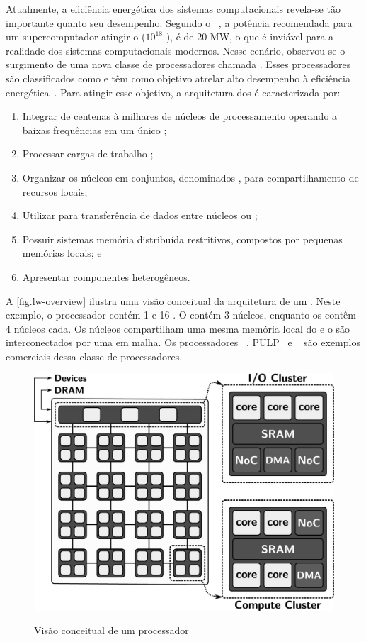 Atualmente, a eficiência energética dos sistemas computacionais revela-se tão importante quanto seu desempenho. Segundo o \darpa~\cite{darpa:exascale}, a potência recomendada para um supercomputador atingir o \exascale ($10^{18}$ \flops), é de 20 MW, o que é inviável para a realidade dos sistemas computacionais modernos. Nesse cenário, observou-se o surgimento de uma nova classe de processadores chamada \lw. Esses processadores são classificados como \mpsocs e têm como objetivo atrelar alto desempenho à eficiência energética~\cite{francesquini2015}. Para atingir esse objetivo, a arquitetura dos \lws é caracterizada por:
\begin{enumerate}[label=(\roman*)]
    \item Integrar de centenas à milhares de núcleos de processamento operando a baixas frequências em um único \chip;
    \item Processar cargas de trabalho \mimd;
    \item Organizar os núcleos em conjuntos, denominados \clusters, para compartilhamento de recursos locais;
    \item Utilizar \nocs para transferência de dados entre núcleos ou \clusters;
    \item Possuir sistemas memória distribuída restritivos, compostos por pequenas memórias locais; e
    \item Apresentar componentes heterogêneos.
\end{enumerate}
A \autoref{fig.lw-overview} ilustra uma visão conceitual da arquitetura de um \lw. Neste exemplo, o processador contém 1 \iocluster e 16 \cclusters. O \iocluster contém 3 núcleos, enquanto os \cclusters contêm 4 núcleos cada. Os núcleos compartilham uma mesma memória local do \cluster e o \clusters são interconectados por uma \noc em malha. Os processadores \mppa~\cite{dinechin:2013}, PULP~\cite{pulp} e \taihulight~\cite{fu2016sunway} são exemplos comerciais dessa classe de processadores.

\begin{figure}[t]
	\centering
	\caption{Visão conceitual de um processador \lw}
	\includegraphics[width=0.5\linewidth]{content/images/lw-overview-gs.jpg}
    \label{fig.lw-overview}
\end{figure}


